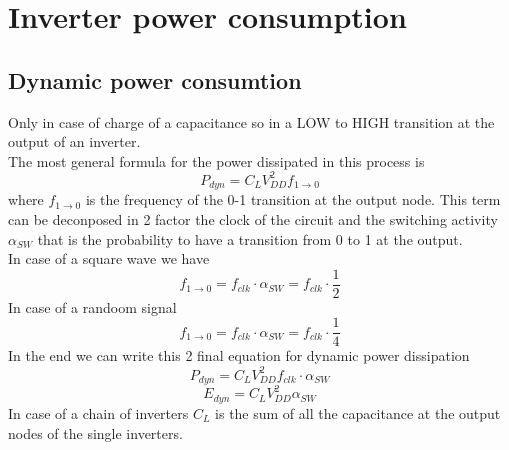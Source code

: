 \chapter{Inverter power consumption}
\section{Dynamic power consumtion}
Only in case of charge of a capacitance so in a LOW to HIGH transition at the output of an inverter. \\
The most general formula for the power dissipated in this process is
\begin{equation}
P_{dyn}=C_LV_{DD}^2f_{1\rightarrow 0}
\end{equation}
where $f_{1\rightarrow 0}$ is the frequency of the 0-1 transition at the output node. This term can be deconposed in 2 factor the clock of the circuit and the switching activity $\alpha_{SW}$ that is the probability to have a transition from 0 to 1 at the output.\\
\vspace{2mm}
\tab In case of a square wave we have 
\begin{equation}
f_{1\rightarrow 0}=f_{clk}\cdot \alpha_{SW}=f_{clk}\cdot \frac{1}{2}
\end{equation}
\tab In case of a randoom signal 
\begin{equation}
f_{1\rightarrow 0}=f_{clk}\cdot \alpha_{SW}=f_{clk}\cdot \frac{1}{4}
\end{equation}
\vspace{5mm}
In the end we can write this 2 final equation for dynamic power dissipation
\begin{equation}
P_{dyn}=C_LV_{DD}^2 f_{clk}\cdot \alpha_{SW}
\end{equation}
\begin{equation}
E_{dyn}=C_LV_{DD}^2\alpha_{SW}
\end{equation}
In case of a chain of inverters $C_L$ is the sum of all the capacitance at the output nodes of the single inverters.\\



